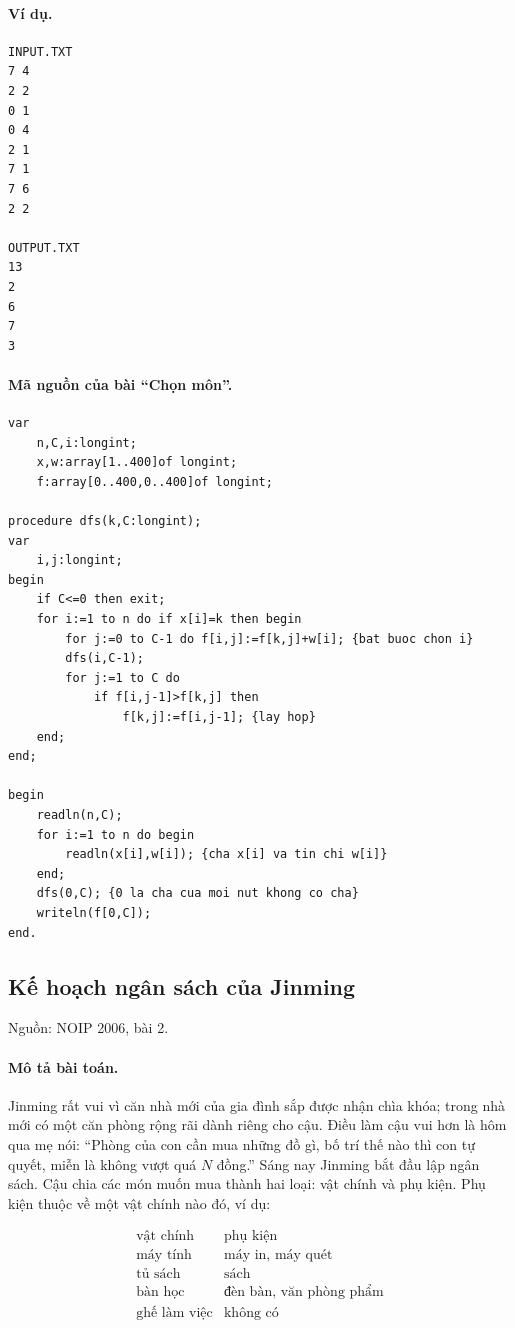 \documentclass[11pt]{article}
\begin{document}
\paragraph{Ví dụ.}
\begin{verbatim}
INPUT.TXT
7 4
2 2
0 1
0 4
2 1
7 1
7 6
2 2

OUTPUT.TXT
13
2
6
7
3
\end{verbatim}

\paragraph{Mã nguồn của bài ``Chọn môn''.}
\begin{verbatim}
var
    n,C,i:longint;
    x,w:array[1..400]of longint;
    f:array[0..400,0..400]of longint;

procedure dfs(k,C:longint);
var
    i,j:longint;
begin
    if C<=0 then exit;
    for i:=1 to n do if x[i]=k then begin
        for j:=0 to C-1 do f[i,j]:=f[k,j]+w[i]; {bat buoc chon i}
        dfs(i,C-1);
        for j:=1 to C do
            if f[i,j-1]>f[k,j] then
                f[k,j]:=f[i,j-1]; {lay hop}
    end;
end;

begin
    readln(n,C);
    for i:=1 to n do begin
        readln(x[i],w[i]); {cha x[i] va tin chi w[i]}
    end;
    dfs(0,C); {0 la cha cua moi nut khong co cha}
    writeln(f[0,C]);
end.
\end{verbatim}

\subsection{Kế hoạch ngân sách của Jinming}

Nguồn: NOIP 2006, bài 2.

\paragraph{Mô tả bài toán.}
Jinming rất vui vì căn nhà mới của gia đình sắp được nhận chìa khóa; trong nhà
mới có một căn phòng rộng rãi dành riêng cho cậu. Điều làm cậu vui hơn là hôm
qua mẹ nói: ``Phòng của con cần mua những đồ gì, bố trí thế nào thì con tự
quyết, miễn là không vượt quá \(N\) đồng.'' Sáng nay Jinming bắt đầu lập ngân
sách. Cậu chia các món muốn mua thành hai loại: vật chính và phụ kiện. Phụ
kiện thuộc về một vật chính nào đó, ví dụ:

\[
\begin{array}{c|l}
\text{vật chính} & \text{phụ kiện}\\
\hline
\text{máy tính} & \text{máy in, máy quét}\\
\text{tủ sách} & \text{sách}\\
\text{bàn học} & \text{đèn bàn, văn phòng phẩm}\\
\text{ghế làm việc} & \text{không có}
\end{array}
\]
\end{document}
